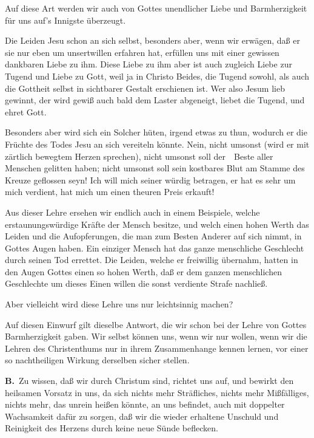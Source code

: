 \begin{aufza}
\begin{aufzb}
\item Auf diese Art werden wir auch von Gottes unendlicher Liebe und Barmherzigkeit für uns auf's Innigste überzeugt.
\item Die Leiden Jesu schon an sich selbst, besonders aber, wenn wir erwägen, daß er sie nur eben um unsertwillen erfahren hat, erfüllen uns mit einer gewissen dankbaren Liebe zu ihm. Diese Liebe zu ihm aber ist auch zugleich Liebe zur Tugend und Liebe zu Gott, weil ja in Christo Beides, die Tugend sowohl, als auch die Gottheit selbst in sichtbarer Gestalt erschienen ist. Wer also Jesum lieb gewinnt, der wird gewiß auch bald dem Laster abgeneigt, liebet die Tugend, und ehret Gott.
\item Besonders aber wird sich ein Solcher hüten, irgend etwas zu thun, wodurch er die Früchte des Todes Jesu an sich vereiteln könnte. Nein, nicht umsonst (wird er mit zärtlich bewegtem Herzen sprechen), nicht umsonst soll der~\ Beste aller Menschen gelitten haben; nicht umsonst soll sein kostbares Blut am Stamme des Kreuze geflossen seyn! Ich will mich seiner würdig betragen, er hat es sehr um mich verdient, hat mich um einen theuren Preis erkauft!
\item Aus dieser Lehre ersehen wir endlich auch in einem Beispiele, welche erstaunungswürdige Kräfte der Mensch besitze, und welch einen hohen Werth das Leiden und die Aufopferungen, die man zum Besten Anderer auf sich nimmt, in Gottes Augen haben. Ein einziger Mensch hat das ganze menschliche Geschlecht durch seinen Tod errettet. Die Leiden, welche er freiwillig übernahm, hatten in den Augen Gottes einen so hohen Werth, daß er dem ganzen menschlichen Geschlechte um dieses Einen willen die sonst verdiente Strafe nachließ.
\end{aufzb}\par
{} Aber vielleicht wird diese Lehre uns nur leichtsinnig machen?\par
{} Auf diesen Einwurf gilt dieselbe Antwort, die wir schon bei der Lehre von Gottes Barmherzigkeit gaben. Wir selbst können uns, wenn wir nur wollen, wenn wir die Lehren des Christenthums nur in ihrem Zusammenhange kennen lernen, vor einer so nachtheiligen Wirkung derselben sicher stellen.\par

\vabst \textbf{B.}~Zu wissen, daß wir durch Christum  sind, richtet uns auf, und bewirkt den heilsamen Vorsatz in uns, da sich nichts mehr Sträfliches, nichts mehr Mißfälliges, nichts mehr, das unrein heißen könnte, an uns befindet, auch mit doppelter Wachsamkeit dafür zu sorgen, daß wir die wieder erhaltene Unschuld und Reinigkeit des Herzens durch keine neue Sünde beflecken.\par


\end{aufza}
